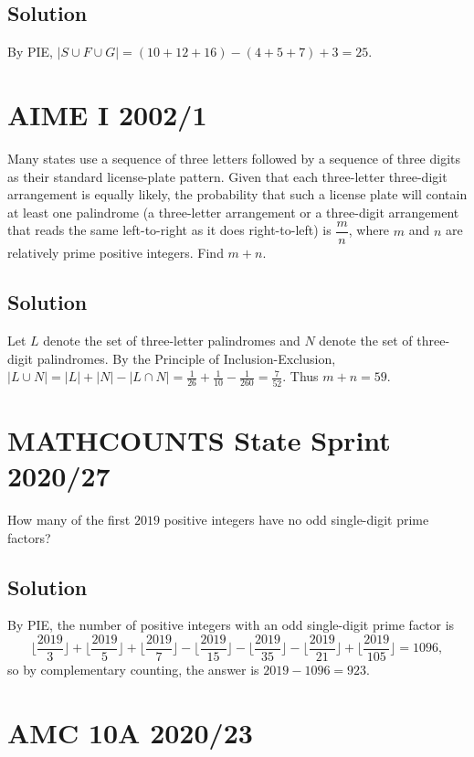 \documentclass{article}
\begin{document}
\subsection{Solution}
By PIE, $|S\cup F\cup G|=(10+12+16)-(4+5+7)+3=25.$


\pagebreak\section{AIME I 2002/1}
Many states use a sequence of three letters followed by a sequence of three digits as their standard license-plate pattern. Given that each three-letter three-digit arrangement is equally likely, the probability that such a license plate will contain at least one palindrome (a three-letter arrangement or a three-digit arrangement that reads the same left-to-right as it does right-to-left) is $\dfrac{m}{n}$, where $m$ and $n$ are relatively prime positive integers. Find $m+n.$

\subsection{Solution}
Let $L$ denote the set of three-letter palindromes and $N$ denote the set of three-digit palindromes. By the Principle of Inclusion-Exclusion, $|L\cup N|=|L|+|N|-|L\cap N|=\frac{1}{26}+\frac{1}{10}-\frac{1}{260}=\frac{7}{52}.$ Thus $m+n=59.$



\pagebreak\section{MATHCOUNTS State Sprint 2020/27}

How many of the first $2019$ positive integers have no odd single-digit prime factors?

\subsection{Solution}

By PIE, the number of positive integers with an odd single-digit prime factor is
\[\lfloor\frac{2019}{3}\rfloor+\lfloor\frac{2019}{5}\rfloor+\lfloor\frac{2019}{7}\rfloor-\lfloor\frac{2019}{15}\rfloor-\lfloor\frac{2019}{35}\rfloor-\lfloor\frac{2019}{21}\rfloor+\lfloor\frac{2019}{105}\rfloor=1096,\]
so by complementary counting, the answer is $2019-1096=923.$


\pagebreak\section{AMC 10A 2020/23}
\end{document}
